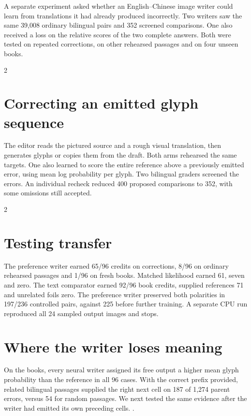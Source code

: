 \noindent A separate experiment asked whether an English--Chinese image writer could learn from translations it had already produced incorrectly. Two writers saw the same 39,008 ordinary bilingual pairs and 352 screened comparisons. One also received a loss on the relative scores of the two complete answers. Both were tested on repeated corrections, on other rehearsed passages and on four unseen books.\par
\begin{multicols}{2}
\section*{Correcting an emitted glyph sequence}
The editor reads the pictured source and a rough visual translation, then generates glyphs or copies them from the draft.\cite{pointer} Both arms rehearsed the same targets. One also learned to score the entire reference above a previously emitted error, using mean log probability per glyph. Two bilingual graders screened the errors. An individual recheck reduced 400 proposed comparisons to 352, with some omissions still accepted.
\end{multicols}
\begin{multicols}{2}
\section*{Testing transfer}
The preference writer earned 65/96 credits on corrections, 8/96 on ordinary rehearsed passages and 1/96 on fresh books. Matched likelihood earned 61, seven and zero. The text comparator earned 92/96 book credits, supplied references 71 and unrelated foils zero. The preference writer preserved both polarities in 197/236 controlled pairs, against 225 before further training. A separate CPU run reproduced all 24 sampled output images and stops.
\section*{Where the writer loses meaning}
On the books, every neural writer assigned its free output a higher mean glyph probability than the reference in all 96 cases. With the correct prefix provided, related bilingual passages supplied the right next cell on 187 of 1,274 parent errors, versus 54 for random passages. We next tested the same evidence after the writer had emitted its own preceding cells. .
\end{multicols}
